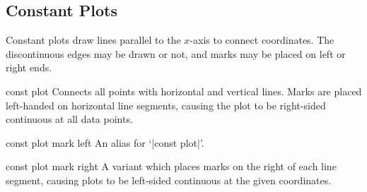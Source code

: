 {\subsection{Constant Plots}
Constant plots draw lines parallel to the $x$-axis to connect coordinates. The discontinuous edges may be drawn or not, and marks may be placed on left or right ends.

\begin{plottype}{const plot}
Connects all points with horizontal and vertical lines. Marks are placed left-handed on horizontal line segments, causing the plot to be right-sided continuous at all data points.

\begin{codeexample}[]
\end{codeexample}


\begin{codeexample}[]
\end{codeexample}
\end{plottype}

\begin{plottype}{const plot mark left}
An alias for `|const plot|'.
\end{plottype}

\begin{plottype}{const plot mark right}
 A variant which places marks on the right of each line segment, causing plots to be left-sided continuous at the given coordinates.
\begin{codeexample}[]
\end{codeexample}
\end{plottype}

}
